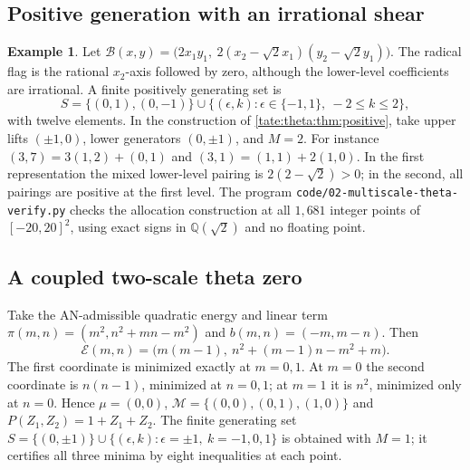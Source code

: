 \documentclass[11pt,letterpaper]{article}
\theoremstyle{definition}
\newtheorem{example}[example]{Example}
\newcommand{\Q}{\mathbb Q}
\newcommand{\file}[1]{\nolinkurl{#1}}
\newcommand{\cB}{\mathcal B}
\newcommand{\cE}{\mathcal E}
\newcommand{\cM}{\mathcal M}
\begin{document}
\subsection{Positive generation with an irrational shear}

\begin{example}\label{tate:theta:ex:shear}
Let $\cB(x,y)=\bigl(2x_1y_1,\ 2(x_2-\sqrt2x_1)(y_2-\sqrt2y_1)\bigr)$. The
radical flag is the rational $x_2$-axis followed by zero, although the
lower-level coefficients are irrational. A finite positively generating set
is
\[
 S=\{(0,1),(0,-1)\}\cup\{(\epsilon,k):\epsilon\in\{-1,1\},\ -2\le k\le2\},
\]
with twelve elements. In the construction of
\cref{tate:theta:thm:positive}, take upper lifts $(\pm1,0)$, lower
generators $(0,\pm1)$, and $M=2$. For instance $(3,7)=3(1,2)+(0,1)$ and
$(3,1)=(1,1)+2(1,0)$. In the first representation the mixed lower-level
pairing is $2(2-\sqrt2)>0$; in the second, all pairings are positive at the
first level. The program \file{code/02-multiscale-theta-verify.py}
checks the allocation construction at all $1{,}681$ integer points of
$[-20,20]^2$, using exact signs in $\Q(\sqrt2)$ and no floating point.
\end{example}

\subsection{A coupled two-scale theta zero}\label{tate:theta:sec:coupled}

Take the AN-admissible quadratic energy and linear term
$\pi(m,n)=(m^2,n^2+mn-m^2)$ and $b(m,n)=(-m,m-n)$. Then
\begin{equation}
 \cE(m,n)=\bigl(m(m-1),\ n^2+(m-1)n-m^2+m\bigr).\label{tate:theta:eq:coupledenergy}
\end{equation}
The first coordinate is minimized exactly at $m=0,1$. At $m=0$ the second
coordinate is $n(n-1)$, minimized at $n=0,1$; at $m=1$ it is $n^2$,
minimized only at $n=0$. Hence $\mu=(0,0)$,
$\cM=\{(0,0),(0,1),(1,0)\}$ and $P(Z_1,Z_2)=1+Z_1+Z_2$. The finite
generating set $S=\{(0,\pm1)\}\cup\{(\epsilon,k):\epsilon=\pm1,\ k=-1,0,1\}$
is obtained with $M=1$; it certifies all three minima by eight inequalities
at each point.
\end{document}

